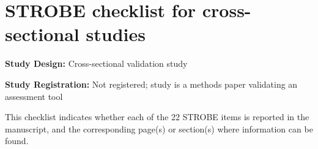 \documentclass{article}
\begin{document}

\newpage
\section{STROBE checklist for cross-sectional studies}\label{app:strobe}

\noindent \textbf{Study Design:} Cross-sectional validation study

\noindent \textbf{Study Registration:} Not registered; study is a methods paper validating an assessment tool

\vspace{12pt}

\noindent This checklist indicates whether each of the 22 STROBE items is reported in the manuscript, and the corresponding page(s) or section(s) where information can be found.

\vspace{12pt}
\end{document}
